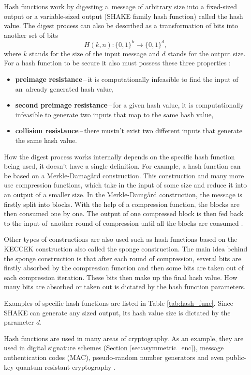 Hash functions work by digesting a~message of arbitrary size into a fixed-sized output or a variable-sized output (SHAKE family hash function) called the hash value. The digest process can also be described as a transformation of bits into another set of bits
\begin{equation}
  H(k, n): \{0,1\}^k \rightarrow \{0,1\}^d,
\end{equation}
where $k$ stands for the size of the input message and $d$ stands for the output size.
\newpage
\noindent For a hash function to be secure it also must possess these three properties \cite{Paar2010}:
\begin{itemize}
  \item \textbf{preimage resistance}\,--\,it is computationally infeasible to find the input of an~already generated hash value,
  \item \textbf{second preimage resistance}\,--\,for a given hash value, it is computationally infeasible to generate two inputs that map to the same hash value,
  \item \textbf{collision resistance}\,--\,there mustn't exist two different inputs that generate the same hash value.
\end{itemize}

How the digest process works internally depends on the specific hash function being used, it doesn't have a single definition. For example, a hash function can be based on a Merkle-Damag\aa rd construction. This construction and many more use compression functions, which take in the input of some size and reduce it into an output of a smaller size. In the Merkle-Damg\aa rd construction, the message is firstly split into blocks. With the help of a compression function, the blocks are then consumed one by one. The output of one compressed block is then fed back to the input of~another round of compression until all the blocks are consumed \cite{Smart2004}.

Other types of constructions are also used such as hash functions based on the KECCEK construction also called the sponge construction. The main idea behind the sponge construction is that after each round of compression, several bits are firstly absorbed by the compression function and then some bits are taken out of each compression iteration. These bits then make up the final hash value. How many bits are absorbed or taken out is dictated by the hash function parameters. \cite{1Od8f4TuMxetfmHu}

Examples of specific hash functions are listed in Table \ref{tab:hash_func}. Since SHAKE can generate any sized output, its hash value size is dictated by the parameter $d$.


Hash functions are used in many areas of cryptography. As an example, they are used in digital signature schemes (Section \ref{sec:asymmetric_enc}), message authentication codes (\acs{MAC}), pseudo-random number generators and even public-key quantum-resistant cryptography \cite{Chen2016}.
